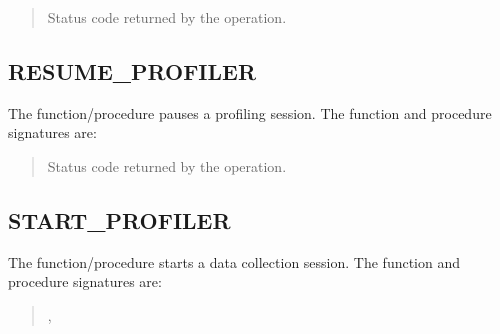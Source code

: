 \documentclass[letterpaper,10pt,english,openany,oneside]{sphinxmanual}
\begin{document}

\begin{quote}

Status code returned by the operation.
\end{quote}


\subsection{RESUME\_PROFILER}
\label{\detokenize{dbms_profiler:resume-profiler}}
The  function/procedure pauses a profiling session. The
function and procedure signatures are:
\begin{quote}


\end{quote}


\begin{quote}

Status code returned by the operation.
\end{quote}


\subsection{START\_PROFILER}
\label{\detokenize{dbms_profiler:start-profiler}}
The  function/procedure starts a data collection session.
The function and procedure signatures are:
\begin{quote}

,
\begin{quote}

\end{quote}

\begin{quote}

\end{quote}
\end{quote}
\end{document}
